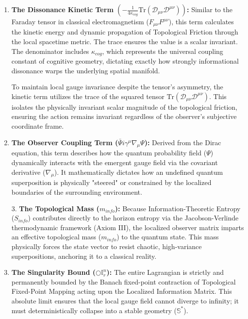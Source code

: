 \documentclass[12pt,openany]{book}
\theoremstyle{plain}
\theoremstyle{definition}
\theoremstyle{remark}
\begin{document}
\begin{enumerate}
    \item \textbf{The Dissonance Kinetic Term $\left(-\frac{1}{4\kappa_{cog}} \text{Tr}(\mathcal{D}_{\mu\nu} \mathcal{D}^{\mu\nu})\right)$:} Similar to the Faraday tensor in classical electromagnetism ($F_{\mu\nu}F^{\mu\nu}$), this term calculates the kinetic energy and dynamic propagation of Topological Friction through the local spacetime metric. The trace ensures the value is a scalar invariant. The denominator includes $\kappa_{cog}$, which represents the universal coupling constant of cognitive geometry, dictating exactly how strongly informational dissonance warps the underlying spatial manifold. 

    To maintain local gauge invariance despite the tensor's asymmetry, the kinetic term utilizes the trace of the squared tensor $\text{Tr}(\mathcal{D}_{\mu\nu} \mathcal{D}^{\mu\nu})$. This isolates the physically invariant scalar magnitude of the topological friction, ensuring the action remains invariant regardless of the observer's subjective coordinate frame.
    
    \item \textbf{The Observer Coupling Term ($\bar{\Psi} i\gamma^\mu \nabla_\mu \Psi$):} Derived from the Dirac equation, this term describes how the quantum probability field ($\Psi$) dynamically interacts with the emergent gauge field via the covariant derivative ($\nabla_\mu$). It mathematically dictates how an undefined quantum superposition is physically "steered" or constrained by the localized boundaries of the surrounding environment.
    
3. \textbf{The Topological Mass ($m_{info}$):} Because Information-Theoretic Entropy ($S_{info}$) contributes directly to the horizon entropy via the Jacobson-Verlinde thermodynamic framework (Axiom III), the localized observer matrix imparts an effective topological mass ($m_{info}$) to the quantum state. This mass physically forces the state vector to resist chaotic, high-variance superpositions, anchoring it to a classical reality.
    
    \item \textbf{The Singularity Bound ($\bigcirc \mathbb{I}_r^n$):} The entire Lagrangian is strictly and permanently bounded by the Banach fixed-point contraction of Topological Fixed-Point Mapping acting upon the Localized Information Matrix. This absolute limit ensures that the local gauge field cannot diverge to infinity; it must deterministically collapse into a stable geometry ($\mathbb{S}^*$).
\end{enumerate}
\end{document}
